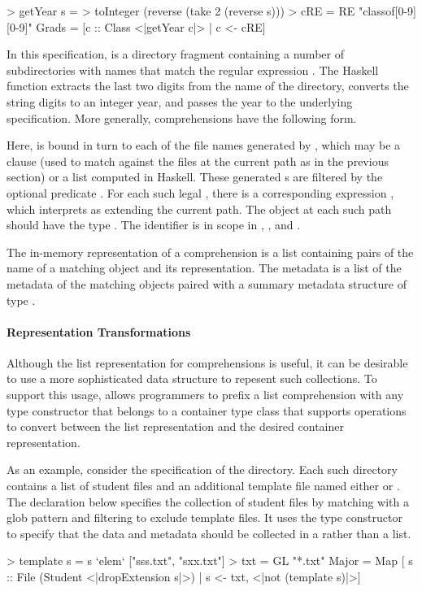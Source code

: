 \begin{code}
> getYear s = 
>   toInteger (reverse (take 2 (reverse s)))
> cRE = RE "classof[0-9][0-9]"
\mbox{}
 Grads = 
  [c :: Class <|getYear c|> | c <-  cRE]
\end{code}
In this specification,  is a directory fragment containing a number of
 subdirectories with names  that match the regular expression
.  The Haskell function  extracts the last two digits from the
name of the directory, converts the string digits to an integer year, and passes
the year to the underlying  specification.
More generally, comprehensions have the following form.
\begin{code}
\end{code}
Here,  is bound in turn to each of the file names generated by
, which may be a  clause (used to match against
the files at the current path as in the previous section) or a list
computed in Haskell.  These generated s are filtered by the
optional predicate .  For each such legal , there is a
corresponding expression , which \forest{} interprets as extending
the current path.  The object at each such path should have the \forest{}
type .  The identifier  is in scope in ,
, and .  

The in-memory representation of a comprehension is a list containing
pairs of the name of a matching object and its representation.  The
metadata is a list of the metadata of the matching objects paired with
a summary metadata structure of type .


\paragraph*{Representation Transformations}
Although the list representation for comprehensions is useful, it can
be desirable to use a more sophisticated data structure to
repesent such collections.  To support
this usage, \forest{} allows programmers to prefix a list
comprehension with any type constructor that belongs to a 
container type class that supports operations to convert between the
list representation and the desired container representation. 

As an example, consider the specification of the  directory.
Each such directory contains a list of student files and an additional
template file named either  or .  The
declaration below specifies the collection of student files by
matching with a glob pattern and filtering to exclude 
template files. It uses the  type constructor to specify that
the data and metadata should be collected in a
 rather than a list.
\begin{code}
> template s = s `elem` ["sss.txt", "sxx.txt"]
> txt = GL "*.txt"
\mbox{}
 Major = Map
   [ s :: File (Student <|dropExtension s|>) 
   | s <-  txt, <|not (template s)|>]
\end{code}


